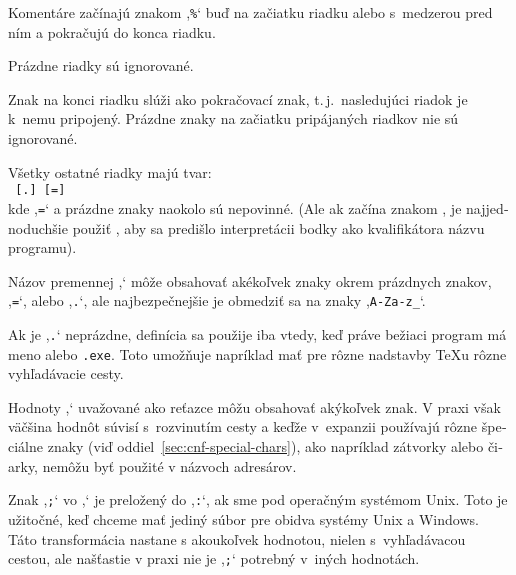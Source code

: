 \documentclass[\classoptions,slovak,english,czech]{\classname}
\newcommand{\singleuv}[1]{,#1`}
\begin{document}
\begin{otherlanguage}{slovak}
\begin{itemize*}
\item
  Komentáre začínajú znakom \singleuv{\texttt{\%}} buď na začiatku riadku alebo s~medzerou pred ním a pokračujú do konca
  riadku.
\item
  Prázdne riadky sú ignorované.
\item
  Znak \bs{} na konci riadku slúži ako pokračovací znak, t.\,j.\
  nasledujúci riadok je k~nemu pripojený. Prázdne znaky na začiatku
  pripájaných riadkov nie sú ignorované.
\item
  Všetky ostatné riadky majú tvar:\\
  \hspace*{2em}\texttt{ \textrm{[}.\textrm{]}
  	\textrm{[}=\textrm{]} \var{value}}\\[1pt]
  kde \singleuv{\texttt{=}} a prázdne znaky naokolo sú nepovinné.
  (Ale ak  začína znakom , je najjednoduchšie použiť
  \samp{=}, aby sa predišlo interpretácii bodky ako kvalifikátora názvu programu).
\item
  Názov premennej \singleuv{\texttt{}} môže obsahovať
  akékoľvek znaky okrem prázdnych znakov, \singleuv{\texttt{=}}, alebo \singleuv{\texttt{.}},
  ale najbezpečnejšie je obmedziť sa na znaky \singleuv{\texttt{A-Za-z\_}}.
\item
  Ak je \singleuv{\texttt{.}} neprázdne, definícia sa
  použije iba vtedy, keď práve bežiaci program má meno
  \texttt{} alebo \texttt{\var{progname}.exe}.
  Toto umožňuje napríklad mať pre rôzne nadstavby \TeX u rôzne
  vyhľadávacie cesty.
\item Hodnoty \singleuv{\texttt{}} uvažované ako reťazce môžu obsahovať akýkoľvek znak.
V praxi však väčšina hodnôt \file{texmf.cnf} súvisí s~rozvinutím cesty
a keďže v~expanzii  používajú rôzne špeciálne znaky
(viď oddiel~\ref{sec:cnf-special-chars}), ako napríklad zátvorky alebo čiarky,
nemôžu byť použité v názvoch adresárov.

Znak \singleuv{\texttt{;}} vo \singleuv{\texttt{}} je preložený do \singleuv{\texttt{:}}, 
ak sme pod operačným systémom Unix. Toto je užitočné, keď chceme mať jediný
súbor \file{texmf.cnf} pre obidva systémy Unix a Windows.
Táto transformácia nastane s akoukoľvek hodnotou, nielen s~vyhľadávacou cestou,
ale našťastie v praxi nie je \singleuv{\texttt{;}} potrebný
v~iných hodnotách.


\end{itemize*}
\end{otherlanguage}
\end{document}

